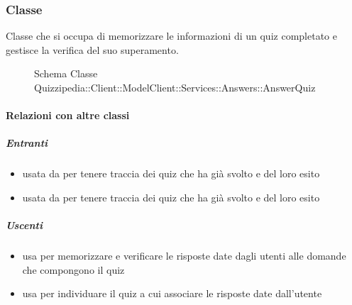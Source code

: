 \subsubsection{Classe }
Classe che si occupa di memorizzare le informazioni di un quiz completato e gestisce la verifica del suo superamento.
\begin{figure}[H]
\centering
\noindent{}
\caption[Schema Classe AnswerQuiz]{Schema Classe Quizzipedia::Client::ModelClient::Services::Answers::AnswerQuiz}
\end{figure}
\paragraph{Relazioni con altre classi}
\subparagraph{Entranti}
\begin{itemize}
\item usata da  per tenere traccia dei quiz che ha già svolto e del loro esito
\item usata da  per tenere traccia dei quiz che ha già svolto e del loro esito
\end{itemize}
\subparagraph{Uscenti}
\begin{itemize}
\item usa  per memorizzare e verificare le risposte date dagli utenti alle domande che compongono il quiz
\item usa  per individuare il quiz a cui associare le risposte date dall'utente
\end{itemize}

